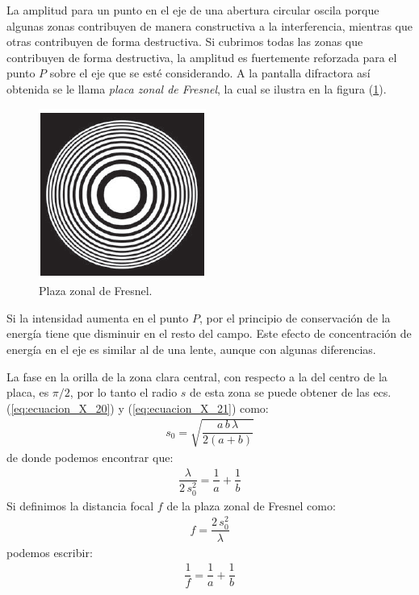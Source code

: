\documentclass[14pt]{extarticle}
\begin{document}
La amplitud para un punto en el eje de una abertura circular oscila porque algunas zonas contribuyen de manera constructiva a la interferencia, mientras que otras contribuyen de forma destructiva. Si cubrimos todas las zonas que contribuyen de forma destructiva, la amplitud es fuertemente reforzada para el punto $P$ sobre el eje que se esté considerando. A la pantalla difractora así obtenida se le llama \textit{placa zonal de Fresnel}, la cual se ilustra en la figura (\ref{fig:figura_X_14}).
\begin{figure}[H]
    \centering
    \includegraphics[scale=1]{Imagenes/Difraccion_14.png}
    \caption{Plaza zonal de Fresnel.}
    \label{fig:figura_X_14}
\end{figure}
Si la intensidad aumenta en el punto $P$, por el principio de conservación de la energía tiene que disminuir en el resto del campo. Este efecto de concentración de energía en el eje es similar al de una lente, aunque con algunas diferencias.
\par
La fase en la orilla de la zona clara central, con respecto a la del centro de la placa, es $\pi/2$, por lo tanto el radio $s$ de esta zona se puede obtener de las ecs. (\ref{eq:ecuacion_X_20}) y (\ref{eq:ecuacion_X_21}) como:
\begin{align}
s_{0} = \sqrt{\dfrac{a \, b \, \lambda}{2 (a + b)}}
\label{eq:ecuacion_X_30}
\end{align}
de donde podemos encontrar que:
\begin{align}
\dfrac{\lambda}{2 \, s_{0}^{2}} = \dfrac{1}{a} + \dfrac{1}{b}
\label{eq:ecuacion_X_31}
\end{align}
Si definimos la distancia focal $f$ de la plaza zonal de Fresnel como:
\begin{align}
f = \dfrac{2 \, s_{0}^{2}}{\lambda}
\label{eq:ecuacion_X_32}
\end{align}
podemos escribir:
\begin{align}
\dfrac{1}{f} = \dfrac{1}{a} + \dfrac{1}{b}
\label{eq:ecuacion_X_33}
\end{align}
\end{document}
